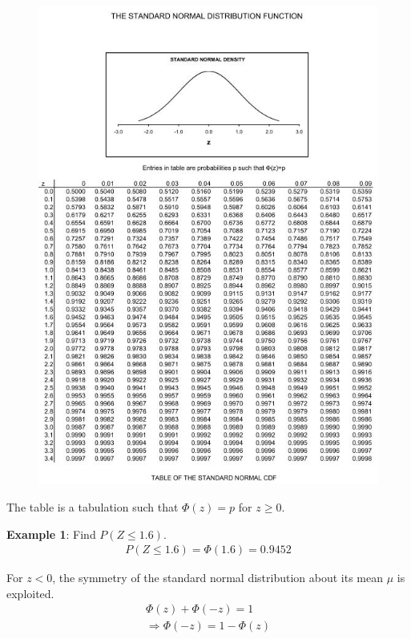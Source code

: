 \documentclass[10pt,a4paper]{article}
\begin{document}
\begin{figure} [h!]
    \centering
    \includegraphics[scale=0.6]{Table.JPG}
\end{figure}

The table is a tabulation such that $\Phi(z)= p$ for $z \geq 0$.

\textbf{Example 1}: Find $P(Z \leq 1.6)$.
\begin{align*}
    P(Z\leq 1.6) = \Phi(1.6) = 0.9452
\end{align*} 
\begin{tcolorbox}[breakable,colback=white]
    For $z<0$, the symmetry of the standard normal distribution about its mean $\mu$ is exploited.
    \begin{align*}
        \Phi(z)+\Phi(-z) = 1 \\ 
        \Rightarrow \Phi(-z) = 1 - \Phi(z)
    \end{align*}
\end{tcolorbox}
\end{document}
